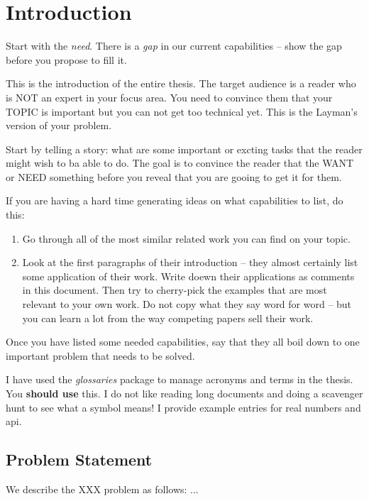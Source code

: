 \chapter{Introduction}
\label{chap:introduction}

 Start with the \emph{need}.
 There is a \emph{gap} in our current capabilities -- show the gap before you propose to fill it.

 This is the introduction of the entire thesis.
 The target audience is a reader who is NOT an expert in your focus area.
 You need to convince them that your TOPIC is important but you can not get too technical
 yet.  This is the Layman's version of your problem.

 Start by telling a story:  what are some important or excting tasks that the reader might
  wish to ba able to do.
  The goal is to convince the reader that the WANT or NEED something before you reveal that
  you are gooing to get it for them.

 If you are having a hard time generating ideas on what capabilities to list,  do this:

\begin{enumerate}
    \item    Go through all of the most similar related work you can find on your topic.
   \item  Look at the first paragraphs of their introduction -- they almost certainly
       list some application of their work.   Write doewn their applications as comments
       in this document.  Then try to cherry-pick the examples that are most relevant to
       your own work.  Do not copy what they say word for word -- but you can learn a lot
       from the way competing papers sell their work.
\end{enumerate}


  Once you have listed some needed capabilities, say that they all boil down to one important
  problem that needs to be solved.



I have used the \emph{glossaries} package to manage acronyms and terms in the thesis.
You \textbf{should use }  this. I do not like reading long documents and doing a scavenger hunt to see what a symbol means! I provide example entries for \glspl{real number}  and \gls{api}.

\section{Problem Statement} \label{sec:problem-statement}
We describe the XXX problem as follows: ...

